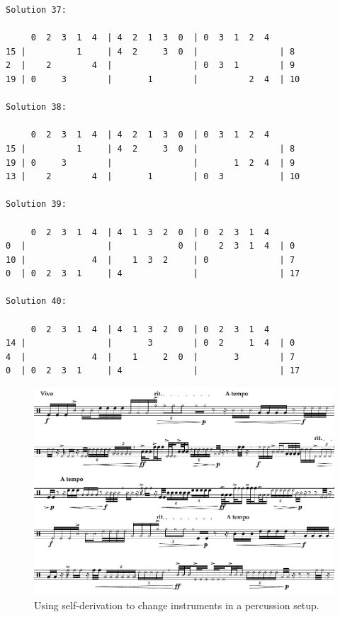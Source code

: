 \begin{lstlisting}[basicstyle=\ttfamily\footnotesize,numbers=none,caption={Output of Listing~\ref{writeSolutions} for problem size three and row $\{0, 2, 3, 1, 4\}$.},label={list:percussion}]
Solution 37:

     0  2  3  1  4  | 4  2  1  3  0  | 0  3  1  2  4  
15 |          1     | 4  2     3  0  |                | 8
2  |    2        4  |                | 0  3  1        | 9
19 | 0     3        |       1        |          2  4  | 10

Solution 38:

     0  2  3  1  4  | 4  2  1  3  0  | 0  3  1  2  4  
15 |          1     | 4  2     3  0  |                | 8
19 | 0     3        |                |       1  2  4  | 9
13 |    2        4  |       1        | 0  3           | 10

Solution 39:

     0  2  3  1  4  | 4  1  3  2  0  | 0  2  3  1  4  
0  |                |             0  |    2  3  1  4  | 0
10 |             4  |    1  3  2     | 0              | 7
0  | 0  2  3  1     | 4              |                | 17

Solution 40:

     0  2  3  1  4  | 4  1  3  2  0  | 0  2  3  1  4  
14 |                |       3        | 0  2     1  4  | 0
4  |             4  |    1     2  0  |       3        | 7
0  | 0  2  3  1     | 4              |                | 17
\end{lstlisting}

\begin{figure}[H]
\centering
\includegraphics[width=6.5in]{figures/Example_Percussion.pdf}
\caption[Using self-derivation in a percussion setup.]{Using self-derivation to change instruments in a percussion setup.}
\label{fig:percussion}
\end{figure}

